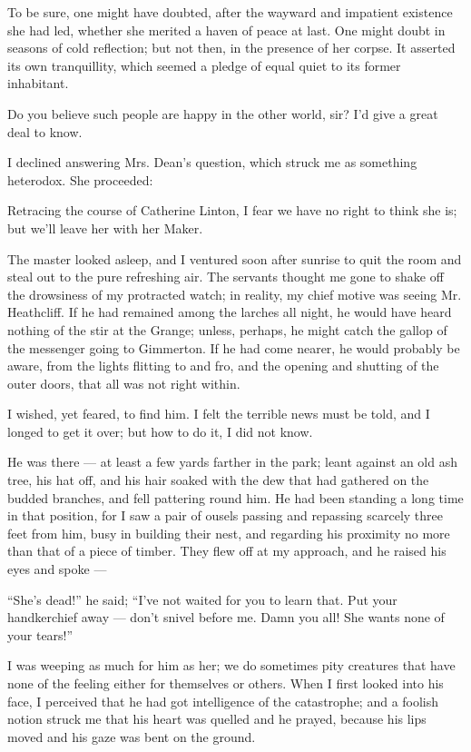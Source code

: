 \par To be sure, one might have doubted, after the wayward and impatient existence she had led, whether she merited a haven of peace at last. One might doubt in seasons of cold reflection; but not then, in the presence of her corpse. It asserted its own tranquillity, which seemed a pledge of equal quiet to its former inhabitant.
\par Do you believe such people are happy in the other world, sir? I'd give a great deal to know.
\par I declined answering Mrs. Dean's question, which struck me as something heterodox. She proceeded:
\par Retracing the course of Catherine Linton, I fear we have no right to think she is; but we'll leave her with her Maker.
\par The master looked asleep, and I ventured soon after sunrise to quit the room and steal out to the pure refreshing air. The servants thought me gone to shake off the drowsiness of my protracted watch; in reality, my chief motive was seeing Mr. Heathcliff. If he had remained among the larches all night, he would have heard nothing of the stir at the Grange; unless, perhaps, he might catch the gallop of the messenger going to Gimmerton. If he had come nearer, he would probably be aware, from the lights flitting to and fro, and the opening and shutting of the outer doors, that all was not right within.
\par I wished, yet feared, to find him. I felt the terrible news must be told, and I longed to get it over; but how to do it, I did not know.
\par He was there — at least a few yards farther in the park; leant against an old ash tree, his hat off, and his hair soaked with the dew that had gathered on the budded branches, and fell pattering round him. He had been standing a long time in that position, for I saw a pair of ousels passing and repassing scarcely three feet from him, busy in building their nest, and regarding his proximity no more than that of a piece of timber. They flew off at my approach, and he raised his eyes and spoke —
\par “She's dead!” he said; “I've not waited for you to learn that. Put your handkerchief away — don't snivel before me. Damn you all! She wants none of your tears!”
\par I was weeping as much for him as her; we do sometimes pity creatures that have none of the feeling either for themselves or others. When I first looked into his face, I perceived that he had got intelligence of the catastrophe; and a foolish notion struck me that his heart was quelled and he prayed, because his lips moved and his gaze was bent on the ground.
